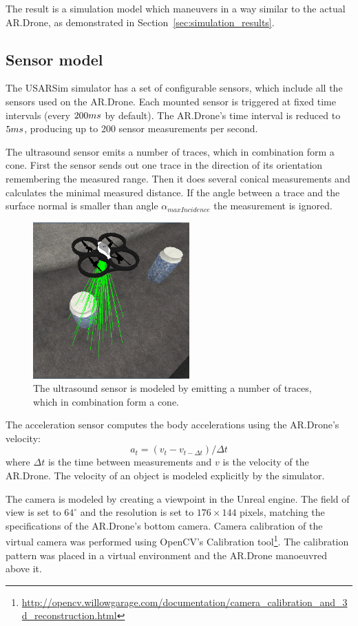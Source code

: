 The result is a simulation model which maneuvers in a way similar to the actual AR.Drone, as demonstrated in Section~\ref{sec:simulation_results}.


		\subsection{Sensor model}
The USARSim simulator has a set of configurable sensors, which include all the sensors used on the AR.Drone.
Each mounted sensor is triggered at fixed time intervals (every $200\small{ms}$ by default).
The AR.Drone's time interval is reduced to $5\small{ms}$, producing up to 200 sensor measurements per second.

The ultrasound sensor emits a number of traces, which in combination form a cone.
First the sensor sends out one trace in the direction of its orientation remembering the measured range.
Then it does several conical measurements and calculates the minimal measured distance.
If the angle between a trace and the surface normal is smaller than angle $\alpha_{maxIncidence}$ the measurement is ignored.

\begin{figure}[htb!]
\centering
\includegraphics[width=6cm]{images/usarsim_sonar_beams.png}
\caption{The ultrasound sensor is modeled by emitting a number of traces, which in combination form a cone.} 
\label{fig:3Dmodel}
\end{figure}


The acceleration sensor computes the body accelerations using the AR.Drone's velocity:
\begin{equation}
a_{t} = (v_{t} - v_{t-\Delta t}) / \Delta t
\end{equation}
where $\Delta t$ is the time between measurements and $v$ is the velocity of the AR.Drone. The velocity of an object is modeled explicitly by the simulator.

The camera is modeled by creating a viewpoint in the Unreal engine.
The field of view is set to $64^\circ$ and the resolution is set to $176 \times 144$ pixels, matching the specifications of the AR.Drone's bottom camera.
Camera calibration of the virtual camera was performed using OpenCV's Calibration tool\footnote{\url{http://opencv.willowgarage.com/documentation/camera_calibration_and_3d_reconstruction.html}}.
The calibration pattern was placed in a virtual environment and the AR.Drone manoeuvred above it.

